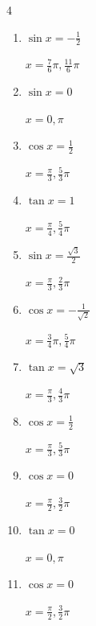 \begin{multicols}{4}
\begin{enumerate}
        $\displaystyle x = \frac{5}{6}\pi , \frac{11}{6}\pi$

  \item $\displaystyle \sin{x}  = -\frac{1}{2}$

        $\displaystyle x = \frac{7}{6}\pi , \frac{11}{6}\pi$

  \item $\displaystyle \sin{x}  = 0$

        $\displaystyle x = 0 , \pi$

  \item $\displaystyle \cos{x}  = \frac{1}{2}$

        $\displaystyle x = \frac{\pi}{3} , \frac{5}{3}\pi$

  \item $\displaystyle \tan{x}  = 1$

        $\displaystyle x = \frac{\pi}{4} , \frac{5}{4}\pi$

  \item $\displaystyle \sin{x}  = \frac{\sqrt{3}}{2}$

        $\displaystyle x = \frac{\pi}{3} , \frac{2}{3}\pi$

  \item $\displaystyle \cos{x}  = -\frac{1}{\sqrt{2}}$

        $\displaystyle x = \frac{3}{4}\pi , \frac{5}{4}\pi$

\columnbreak %

\resetques

  \item $\displaystyle \tan{x}  = \sqrt{3}$

        $\displaystyle x = \frac{\pi}{3} , \frac{4}{3}\pi$

  \item $\displaystyle \cos{x}  = \frac{1}{2}$

        $\displaystyle x = \frac{\pi}{3} , \frac{5}{3}\pi$

  \item $\displaystyle \cos{x}  = 0$

        $\displaystyle x = \frac{\pi}{2} , \frac{3}{2}\pi$

  \item $\displaystyle \tan{x}  = 0$

        $\displaystyle x = 0 , \pi$

  \item $\displaystyle \cos{x}  = 0$

        $\displaystyle x = \frac{\pi}{2} , \frac{3}{2}\pi$


\end{enumerate}
\end{multicols}
